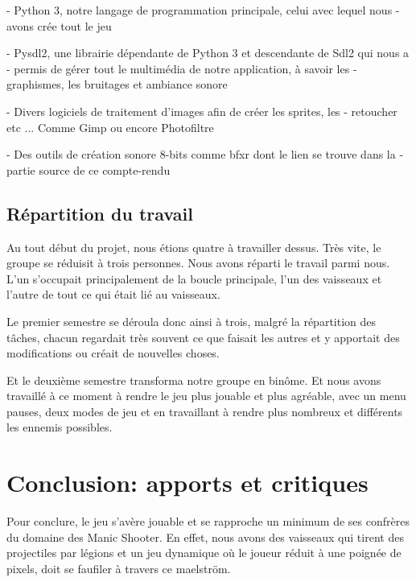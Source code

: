 \documentclass{article}
\begin{document}
- Python 3, notre langage de programmation principale, celui avec lequel nous
- avons crée tout le jeu \newline

- Pysdl2, une librairie dépendante de Python 3 et descendante de Sdl2 qui nous a
- permis de gérer tout le multimédia de notre application, à savoir les
- graphismes, les bruitages et ambiance sonore \newline

- Divers logiciels de traitement d'images afin de créer les sprites, les
- retoucher etc ... Comme Gimp ou encore Photofiltre \newline

- Des outils de création sonore 8-bits comme bfxr dont le lien se trouve dans la
- partie source de ce compte-rendu

\subsection{Répartition du travail}

Au tout début du projet, nous étions quatre à travailler dessus. Très vite, le
groupe se réduisit à trois personnes. Nous avons réparti le travail parmi nous.
L'un s'occupait principalement de la boucle principale, l'un des vaisseaux et
l'autre de tout ce qui était lié au vaisseaux. \newline

Le premier semestre se déroula donc ainsi à trois, malgré la répartition des
tâches, chacun regardait très souvent ce que faisait les autres et y apportait
des modifications ou créait de nouvelles choses. \newline

Et le deuxième semestre transforma notre groupe en binôme. Et nous avons
travaillé à ce moment à rendre le jeu plus jouable et plus agréable, avec un
menu pauses, deux modes de jeu et en travaillant à rendre plus nombreux et
différents les ennemis possibles.

\newpage

\section{Conclusion: apports et critiques}

Pour conclure, le jeu s'avère jouable et se rapproche un minimum de ses confrères du domaine des Manic Shooter. En effet, nous avons des vaisseaux qui tirent des projectiles par légions et un jeu dynamique où le joueur réduit à une poignée de pixels, doit se faufiler à travers ce maelström. \newline
\end{document}
